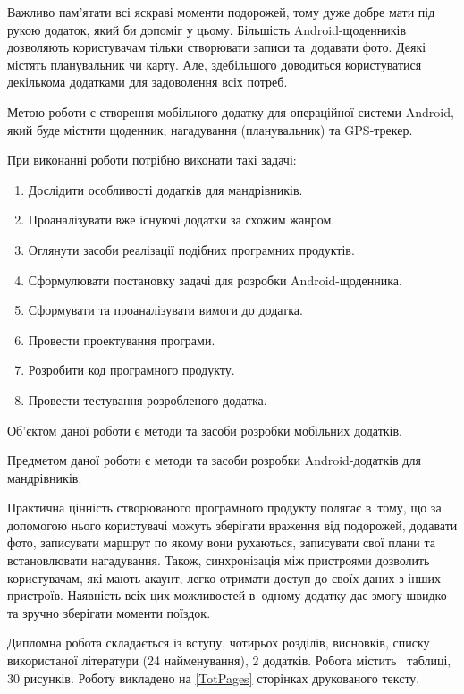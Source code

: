 \documentclass[../main.tex]{subfiles}
\begin{document}
Важливо пам'ятати всі яскраві моменти подорожей, тому дуже добре мати під рукою додаток, який би допоміг у цьому. Більшість Android-щоденників дозволяють користувачам тільки створювати записи та~додавати фото. Деякі містять планувальник чи карту. Але, здебільшого доводиться користуватися декількома додатками для задоволення всіх потреб.

Метою роботи є створення мобільного додатку для операційної системи Android, який буде містити щоденник, нагадування (планувальник) та \mbox{GPS-трекер}.

При виконанні роботи потрібно виконати такі задачі:
\begin{enumerate}
\item Дослідити особливості додатків для мандрівників.
\item Проаналізувати вже існуючі додатки за схожим жанром.
\item Оглянути засоби реалізації подібних програмних продуктів.
\item Сформулювати постановку задачі для розробки Android-щоденника.
\item Сформувати та проаналізувати вимоги до додатка.
\item Провести проектування програми.
\item Розробити код програмного продукту.
\item Провести тестування розробленого додатка.
\end{enumerate}

Об'єктом даної роботи є методи та засоби розробки мобільних додатків. 

Предметом даної роботи є методи та засоби розробки Android-додатків для мандрівників.

Практична цінність створюваного програмного продукту полягає в~тому, що за допомогою нього користувачі можуть зберігати враження від подорожей, додавати фото, записувати маршрут по якому вони рухаються, записувати свої плани та встановлювати нагадування. Також, синхронізація між пристроями дозволить користувачам, які мають акаунт, легко отримати доступ до своїх даних з інших пристроїв. Наявність всіх цих можливостей в~одному додатку дає змогу швидко та зручно зберігати моменти поїздок.

Дипломна робота складається із вступу, чотирьох розділів, висновків, списку використаної літератури (24 найменування), 2 додатків. Робота містить \totaltables\ таблиці, 30 рисунків. Роботу викладено на \ref{TotPages} сторінках друкованого тексту. 
\end{document}
